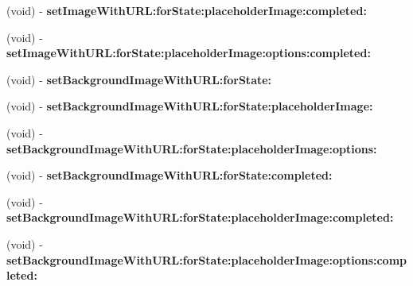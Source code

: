\begin{DoxyCompactItemize}
\item 
\hypertarget{category_u_i_button_07_web_cache_deprecated_08_a6b5c5f7f4d53ef87bc81bf4ceadae81e}{}(void) -\/ {\bfseries set\+Image\+With\+U\+R\+L\+:for\+State\+:placeholder\+Image\+:completed\+:}\label{category_u_i_button_07_web_cache_deprecated_08_a6b5c5f7f4d53ef87bc81bf4ceadae81e}

\item 
\hypertarget{category_u_i_button_07_web_cache_deprecated_08_a4ee180b4511641f5d676979bab2e2d1c}{}(void) -\/ {\bfseries set\+Image\+With\+U\+R\+L\+:for\+State\+:placeholder\+Image\+:options\+:completed\+:}\label{category_u_i_button_07_web_cache_deprecated_08_a4ee180b4511641f5d676979bab2e2d1c}

\item 
\hypertarget{category_u_i_button_07_web_cache_deprecated_08_a35b6f1ed18c77c834fd2be821d4d109c}{}(void) -\/ {\bfseries set\+Background\+Image\+With\+U\+R\+L\+:for\+State\+:}\label{category_u_i_button_07_web_cache_deprecated_08_a35b6f1ed18c77c834fd2be821d4d109c}

\item 
\hypertarget{category_u_i_button_07_web_cache_deprecated_08_ad73e11a4bbc34182223efcae909d4289}{}(void) -\/ {\bfseries set\+Background\+Image\+With\+U\+R\+L\+:for\+State\+:placeholder\+Image\+:}\label{category_u_i_button_07_web_cache_deprecated_08_ad73e11a4bbc34182223efcae909d4289}

\item 
\hypertarget{category_u_i_button_07_web_cache_deprecated_08_ab1142cbc70b8fe7b46eafb6c453fb77a}{}(void) -\/ {\bfseries set\+Background\+Image\+With\+U\+R\+L\+:for\+State\+:placeholder\+Image\+:options\+:}\label{category_u_i_button_07_web_cache_deprecated_08_ab1142cbc70b8fe7b46eafb6c453fb77a}

\item 
\hypertarget{category_u_i_button_07_web_cache_deprecated_08_a4a27f2e7161fe7586d33eecf5414071c}{}(void) -\/ {\bfseries set\+Background\+Image\+With\+U\+R\+L\+:for\+State\+:completed\+:}\label{category_u_i_button_07_web_cache_deprecated_08_a4a27f2e7161fe7586d33eecf5414071c}

\item 
\hypertarget{category_u_i_button_07_web_cache_deprecated_08_a722daec76f97dc8fe469d468635bcfd6}{}(void) -\/ {\bfseries set\+Background\+Image\+With\+U\+R\+L\+:for\+State\+:placeholder\+Image\+:completed\+:}\label{category_u_i_button_07_web_cache_deprecated_08_a722daec76f97dc8fe469d468635bcfd6}

\item 
\hypertarget{category_u_i_button_07_web_cache_deprecated_08_a2ce99f4f407f7f3570690deba9f47872}{}(void) -\/ {\bfseries set\+Background\+Image\+With\+U\+R\+L\+:for\+State\+:placeholder\+Image\+:options\+:completed\+:}\label{category_u_i_button_07_web_cache_deprecated_08_a2ce99f4f407f7f3570690deba9f47872}


\end{DoxyCompactItemize}
